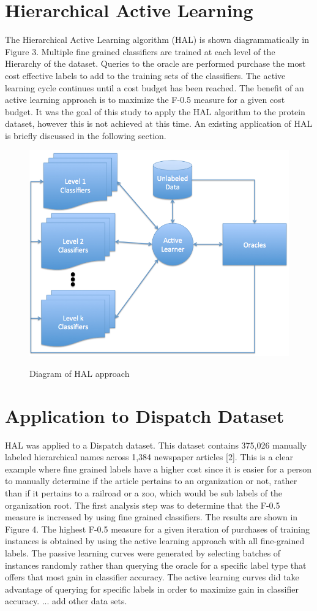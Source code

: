 \documentclass[ms]{nuthesis}
\begin{document}
\section{Hierarchical Active Learning}
\par The Hierarchical Active Learning algorithm (HAL) is shown diagrammatically in Figure 3.
Multiple fine grained classifiers are trained at each level of the Hierarchy of the dataset.
Queries to the oracle are performed purchase the most cost effective labels to add to the
training sets of the classifiers. The active learning cycle continues until a cost budget has
been reached. The benefit of an active learning approach is to maximize the F-0.5 measure
for a given cost budget. It was the goal of this study to apply the HAL algorithm to the
protein dataset, however this is not achieved at this time. An existing application of
HAL is briefly discussed in the following section.


\FloatBarrier
\begin{figure}[!htb]
	\centering
    \includegraphics[width=0.5\columnwidth]{fig/AL2}
    \label{fig:AL2}
    \caption{Diagram of HAL approach}
\end{figure}
\FloatBarrier



\section{Application to Dispatch Dataset}
\par HAL was applied to a Dispatch dataset. This dataset contains 375,026 manually labeled
hierarchical names across 1,384 newspaper articles [2]. This is a clear example where
fine grained labels have a higher cost since it is easier for a person to manually
determine if the article pertains to an organization or not, rather than if it pertains
to a railroad or a zoo, which would be sub labels of the organization root. The first
analysis step was to determine that the F-0.5 measure is increased by using fine
grained classifiers. The results are shown in Figure 4. The highest F-0.5 measure for
a given iteration of purchases of training instances is obtained by using the active
learning approach with all fine-grained labels. The passive learning curves were
 generated by selecting batches of instances randomly rather than querying the
 oracle for a specific label type that offers that most gain in classifier accuracy.
 The active learning curves did take advantage of querying for specific labels in
 order to maximize gain in classifier accuracy. ... add other data sets.
\end{document}
